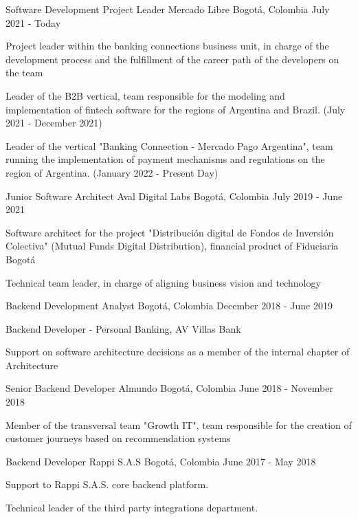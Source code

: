 \begin{cventries}
    \cventry
    {Software Development Project Leader}
    {Mercado Libre}
    {Bogotá, Colombia}
    {July 2021 - Today}
    {
        \begin{cvitems}
            \item {Project leader within the banking connections business unit, in charge of the
            development process and the fulfillment of the career path of the developers on the team}
            \item {Leader of the B2B vertical, team responsible for the modeling and implementation of
            fintech software for the regions of Argentina and Brazil.
                (July 2021 - December 2021)}
            \item {Leader of the vertical "Banking Connection - Mercado Pago Argentina", team running the
            implementation of payment mechanisms and regulations on the region of Argentina.
                (January 2022 - Present Day)}
        \end{cvitems}
    }

    \cventry
    {Junior Software Architect}
    {Aval Digital Labs}
    {Bogotá, Colombia}
    {July 2019 - June 2021}
    {
        \begin{cvitems}
            \item {Software architect for the project
            "Distribución digital de Fondos de Inversión Colectiva" (Mutual Funds Digital Distribution),
                financial product of Fiduciaria Bogotá}
            \item {Technical team leader, in charge of aligning business vision and technology}
        \end{cvitems}
    }
    \cventry
    {Backend Development Analyst}
    {}
    {Bogotá, Colombia}
    {December 2018 - June 2019}
    {
        \begin{cvitems}
            \item {Backend Developer - Personal Banking, AV Villas Bank}
            \item {Support on software architecture decisions as a member of the internal chapter of Architecture}
        \end{cvitems}
    }
    \cventry
    {Senior Backend Developer}
    {Almundo}
    {Bogotá, Colombia}
    {June 2018 - November 2018}
    {
        \begin{cvitems}
            \item {Member of the transversal team "Growth IT", team responsible for the creation of
            customer journeys based on recommendation systems}
        \end{cvitems}
    }
    \cventry
    {Backend Developer}
    {Rappi S.A.S}
    {Bogotá, Colombia}
    {June 2017 - May 2018}
    {
        \begin{cvitems}
            \item {Support to Rappi S.A.S. core backend platform.}
            \item {Technical leader of the third party integrations department.}
        \end{cvitems}
    }


\end{cventries}
